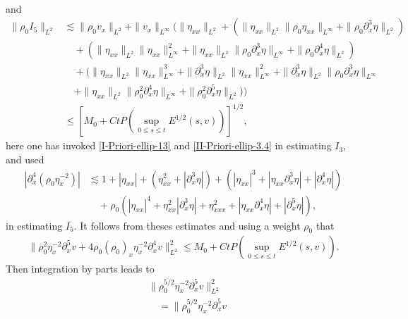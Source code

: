 \documentclass[11pt, reqno]{amsart}
\numberwithin{equation}{section}
\begin{document}
{{\begin{equation*}
\begin{aligned}
\end{aligned}
\end{equation*}}
and
{\small \begin{equation*}
\begin{aligned}
\|\rho_0I_5\|_{L^2}
&\lesssim \|\rho_0v_{x}\|_{L^2}+
\|v_{x}\|_{L^\infty}\big(\|\eta_{xx}\|_{L^2}
+(\|\eta_{xx}\|_{L^2}\|\rho_0\eta_{xx}\|_{L^\infty}
+\|\rho_0\partial_x^3\eta\|_{L^2})\\
&\quad+(\|\eta_{xx}\|_{L^2}\|\eta_{xx}\|_{L^\infty}^2
+\|\eta_{xx}\|_{L^2}\|\rho_0\partial_x^3\eta\|_{L^\infty}
+\|\rho_0\partial_x^4\eta\|_{L^2})\\
&\quad+(\|\eta_{xx}\|_{L^2}\|\eta_{xx}\|_{L^\infty}^3
+\|\partial_x^3\eta\|_{L^2}\|\eta_{xx}\|_{L^\infty}^2
+\|\partial_x^3\eta\|_{L^2}\|\rho_0\partial_x^3\eta\|_{L^\infty}\\
&\quad+\|\eta_{xx}\|_{L^2}\|\rho_0^2\partial_x^4\eta\|_{L^\infty}
+\|\rho_0^2\partial_x^5\eta\|_{L^2})\big)\\
&\leq [M_0+Ct P(\sup_{0\leq s\leq t}E^{1/2}(s,v))]^{1/2},
\end{aligned}
\end{equation*}}
here  one has invoked \eqref{I-Priori-ellip-13} and \eqref{II-Priori-ellip-3.4} in estimating  \(I_3\), and  used
\begin{equation*}
\begin{aligned}
|\partial_x^4(\rho_0\eta_x^{-2})|
&\lesssim 1+|\eta_{xx}|+(\eta_{xx}^2+|\partial_x^3\eta|)
+(|\eta_{xx}|^3+|\eta_{xx}\partial_x^3\eta|+|\partial_x^4\eta|)\\
&\quad+\rho_0(|\eta_{xx}|^4+\eta_{xx}^2|\partial_x^3\eta|+\eta_{xxx}^2+|\eta_{xx}\partial_x^4\eta|+|\partial_x^5\eta|),
\end{aligned}
\end{equation*}
in estimating \(I_5\).
It follows from theses estimates and using a weight \(\rho_0\) that
\begin{equation}\label{II-Priori-ellip-9}
\begin{aligned}
\|\rho_0^2\eta_x^{-2}\partial_x^5v+4\rho_0(\rho_0)_x\eta_x^{-2}\partial_x^4v\|_{L^2}^2\leq M_0+Ct P(\sup_{0\leq s\leq t}E^{1/2}(s,v)).
\end{aligned}
\end{equation}
Then integration by parts leads to
\begin{equation}\label{II-Priori-ellip-10}
\begin{aligned}
&\|\rho_0^{5/2}\eta_x^{-2}\partial_x^5v\|_{L^2}^2\\
&\quad=\|\rho_0^{5/2}\eta_x^{-2}\partial_x^5v

\end{aligned}
\end{equation}}
\end{document}
